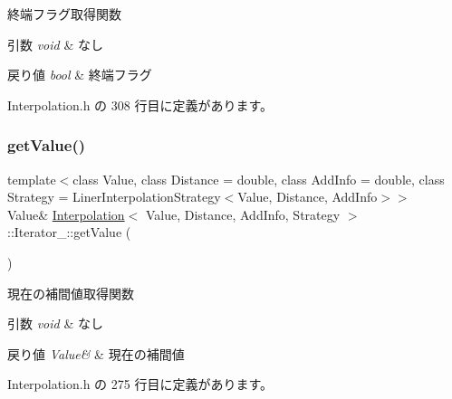 終端フラグ取得関数 


\begin{DoxyParams}{引数}
{\em void} & なし \\
\hline
\end{DoxyParams}

\begin{DoxyRetVals}{戻り値}
{\em bool} & 終端フラグ \\
\hline
\end{DoxyRetVals}


 Interpolation.\+h の 308 行目に定義があります。

\mbox{\label{class_interpolation_1_1_iterator___ab27823f286435ba0a18fe2c18ba00229}} 
\subsubsection{\texorpdfstring{get\+Value()}{getValue()}}
{\footnotesize\ttfamily template$<$class Value, class Distance = double, class Add\+Info = double, class Strategy = Liner\+Interpolation\+Strategy$<$\+Value, Distance, Add\+Info$>$$>$ \\
Value\& \mbox{\hyperlink{class_interpolation}{Interpolation}}$<$ Value, Distance, Add\+Info, Strategy $>$\+::Iterator\+\_\+\+::get\+Value (\begin{DoxyParamCaption}{ }\end{DoxyParamCaption})\hspace{0.3cm}{\ttfamily [inline]}}



現在の補間値取得関数 


\begin{DoxyParams}{引数}
{\em void} & なし \\
\hline
\end{DoxyParams}

\begin{DoxyRetVals}{戻り値}
{\em Value\&} & 現在の補間値 \\
\hline
\end{DoxyRetVals}


 Interpolation.\+h の 275 行目に定義があります。

\mbox{\label{class_interpolation_1_1_iterator___ae7872acdf3be40953a070e4c84a0e8a1}} 
